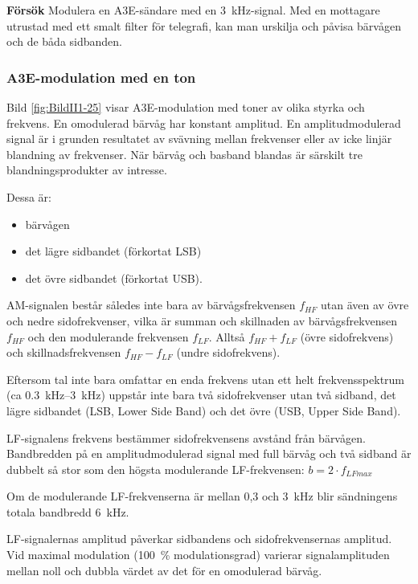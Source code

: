 \noindent\textbf{Försök}
%
Modulera en A3E-sändare med en \SI{3}{\kilo\hertz}-signal.
Med en mottagare utrustad med ett smalt filter för telegrafi, kan man urskilja
och påvisa bärvågen och de båda sidbanden.

\subsubsection{A3E-modulation med en ton}


Bild \ref{fig:BildII1-25} visar A3E-modulation med toner av olika styrka och
frekvens.
En omodulerad bärvåg har konstant amplitud.
En amplitudmodulerad signal är i grunden resultatet av svävning mellan
frekvenser eller av icke linjär blandning av frekvenser.
När bärvåg och basband blandas är särskilt tre blandningsprodukter av
intresse.

Dessa är:
\begin{itemize}
\item bärvågen
\item det lägre sidbandet (förkortat LSB)
\item det övre sidbandet (förkortat USB).
\end{itemize}

AM-signalen består således inte bara av bärvågsfrekvensen \(f_{HF}\) utan även
av övre och nedre sidofrekvenser, vilka är summan och skillnaden av
bärvågsfrekvensen \(f_{HF}\) och den modulerande frekvensen \(f_{LF}\).
Alltså \(f_{HF} + f_{LF}\) (övre sidofrekvens) och skillnadsfrekvensen
\(f_{HF} - f_{LF}\) (undre sidofrekvens).

Eftersom tal inte bara omfattar en enda frekvens utan ett helt frekvensspektrum
(ca \SIrange{0,3}{3}{\kilo\hertz}) uppstår inte bara två sidofrekvenser utan två
sidband, det lägre sidbandet (LSB, Lower Side Band) och det övre (USB, Upper
Side Band).

LF-signalens frekvens bestämmer sidofrekvensens avstånd från bärvågen.
Bandbredden på en amplitudmodulerad signal med full bärvåg och två sidband är
dubbelt så stor som den högsta modulerande LF-frekvensen:
\(b= 2 \cdot f_{LFmax}\)

Om de modulerande LF-frekvenserna är mellan 0,3 och \SI{3}{\kilo\hertz} blir
sändningens totala bandbredd \SI{6}{\kilo\hertz}.

LF-signalernas amplitud påverkar sidbandens och sidofrekvensernas amplitud.
Vid maximal modulation (100~\% modulationsgrad) varierar signalamplituden mellan
noll och dubbla värdet av det för en omodulerad bärvåg.

